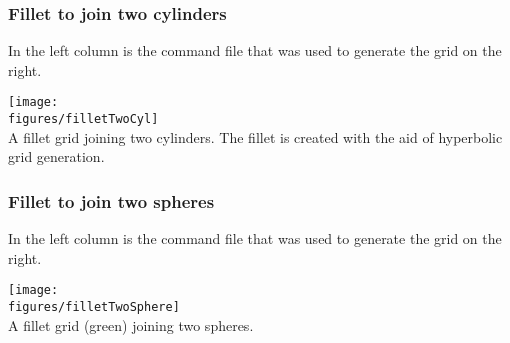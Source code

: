 \subsubsection{Fillet to join two cylinders}
In the left column is the command file that was used to generate the grid on the right.

\noindent
\begin{minipage}{.4\linewidth}
{\footnotesize
{}
}
\end{minipage}\hfill
\begin{minipage}{.6\linewidth}
  \begin{center}
   \texttt{[image: \\figures/filletTwoCyl]} \\
  {A fillet grid joining two cylinders. The fillet is created with the aid of hyperbolic grid generation.}
  \end{center}
\end{minipage}

\subsubsection{Fillet to join two spheres}
In the left column is the command file that was used to generate the grid on the right.

\noindent
\begin{minipage}{.4\linewidth}
{\footnotesize
{}
}
\end{minipage}\hfill
\begin{minipage}{.6\linewidth}
  \begin{center}
   \texttt{[image: \\figures/filletTwoSphere]} \\
  {A fillet grid (green) joining two spheres.}
  \end{center}
\end{minipage}


% 





